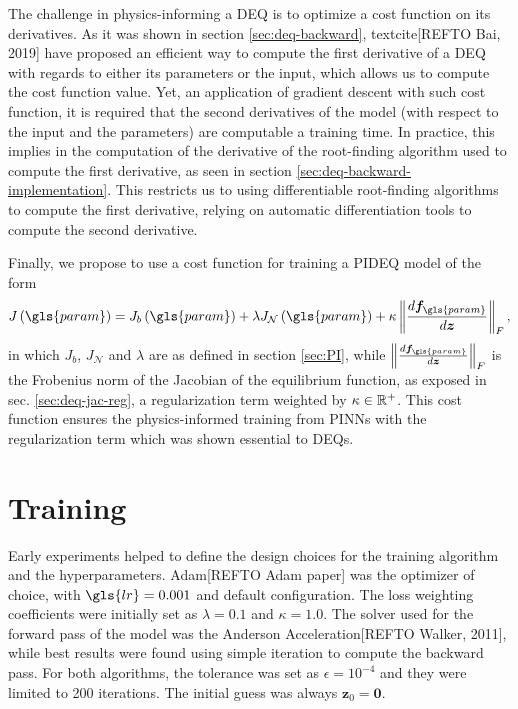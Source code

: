 The challenge in physics-informing a \gls{DEQ} is to optimize a cost function on its derivatives.
As it was shown in section \ref{sec:deq-backward}, textcite[REFTO Bai, 2019] have proposed an efficient way to compute the first derivative of a \gls{DEQ} with regards to either its parameters or the input, which allows us to compute the cost function value.
Yet, an application of gradient descent with such cost function, it is required that the second derivatives of the model (with respect to the input and the parameters) are computable a training time.
In practice, this implies in the computation of the derivative of the root-finding algorithm used to compute the first derivative, as seen in section \ref{sec:deq-backward-implementation}.\footnotemark
{}
This restricts us to using differentiable root-finding algorithms to compute the first derivative, relying on automatic differentiation tools to compute the second derivative.

Finally, we propose to use a cost function for training a \gls{PIDEQ} model of the form \[
    J\left( \gls{param} \right) = J_b\left( \gls{param} \right) + \lambda J_{\mathcal{N}}\left( \gls{param} \right) + \kappa \left\lVert \frac{d \bm{f}_{\gls{param}}}{d \bm{z}}\right\rVert_F
,\] 
in which $J_b$, $J_{\mathcal{N}}$ and $\lambda$ are as defined in section \ref{sec:PI}, while $\left\lVert \frac{d \bm{f}_{\gls{param}}}{d \bm{z}}\right\rVert_F$ is the Frobenius norm of the Jacobian of the equilibrium function, as exposed in sec. \ref{sec:deq-jac-reg}, a regularization term weighted by $\kappa \in \mathbb{R}^+$.
This cost function ensures the physics-informed training from \gls{PINN}s with the regularization term which was shown essential to \gls{DEQ}s.

\section{Training}

Early experiments helped to define the design choices for the training algorithm and the hyperparameters.
Adam[REFTO Adam paper] was the optimizer of choice, with $\gls{lr}=0.001$ and default configuration.
The loss weighting coefficients were initially set as $\lambda=0.1$ and $\kappa=1.0$.
The solver used for the forward pass of the model was the Anderson Acceleration[REFTO Walker, 2011], while best results were found using simple iteration to compute the backward pass.
For both algorithms, the tolerance was set as $\epsilon=10^{-4}$ and they were limited to 200 iterations.
The initial guess was always $\bm{z}_0=\bm{0}$.

